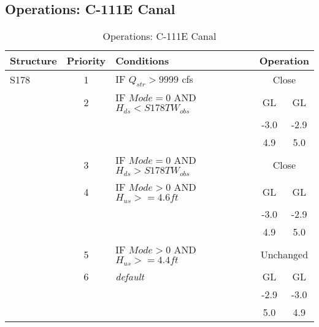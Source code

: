 \clearpage

\subsection{Operations: C-111E Canal}
\scriptsize
\begin{table}[!h]
\centering
\caption{Operations: C-111E Canal}
\label{tab:M11opsC111E}
\begin{tabular}{|l|c|l|c|c|}
\hline
\textbf{Structure} & \textbf{Priority}  & \textbf{Conditions} & \multicolumn{2}{|c|}{\textbf{Operation}}   \\
\hline
\hline
S178          &  1  & IF $Q_{str}>9999$ cfs                              & \multicolumn{2}{|c|}{Close}   \\
\hline
              &  2  & IF $Mode=0$ AND $H_{ds}<S178TW_{obs}$              & GL    & GL   \\
              &     &                                                    & -3.0  & -2.9 \\
              &     &                                                    & 4.9   & 5.0  \\
\hline
              &  3  & IF $Mode=0$ AND $H_{ds}>S178TW_{obs}$              & \multicolumn{2}{|c|}{Close}   \\
\hline
              &  4  & IF $Mode>0$ AND $H_{us}>=4.6 ft$                   & GL    & GL   \\
              &     &                                                    & -3.0  & -2.9 \\
              &     &                                                    & 4.9   & 5.0  \\
\hline
              &  5  & IF $Mode>0$ AND $H_{us}>=4.4ft$                   & \multicolumn{2}{|c|}{Unchanged}   \\
\hline
              &  6  & \it{default}                                       & GL    & GL    \\
              &     &                                                    & -2.9  & -3.0 \\
              &     &                                                    & 5.0   & 4.9  \\
\hline
\hline
\end{tabular}
\end{table}
\normalsize


\cleardoublepage


